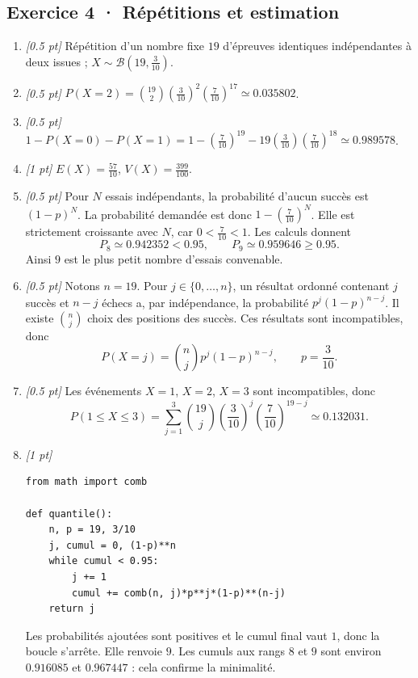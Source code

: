\subsection*{Exercice 4 · Répétitions et estimation}\begin{enumerate}

\item \textit{[\num{0,5} pt]} Répétition d'un nombre fixe $19$ d'épreuves identiques indépendantes à deux issues ; $X\sim\mathcal B(19,\frac{3}{10})$.

\item \textit{[\num{0,5} pt]} $P(X=2)=\binom{19}2(\frac{3}{10})^2(\frac{7}{10})^{17}\simeq\num{0,035802}$.

\item \textit{[\num{0,5} pt]} $1-P(X=0)-P(X=1)=1-(\frac{7}{10})^{19}-19(\frac{3}{10})(\frac{7}{10})^{18}\simeq\num{0,989578}$.

\item \textit{[1 pt]} $E(X)=\frac{57}{10}$, $V(X)=\frac{399}{100}$.

\item \textit{[\num{0,5} pt]} Pour $N$ essais indépendants, la probabilité d'aucun succès est $(1-p)^N$. La probabilité demandée est donc $1-(\frac{7}{10})^N$. Elle est strictement croissante avec $N$, car $0<\frac{7}{10}<1$. Les calculs donnent
\[P_{8}\simeq\num{0,942352}<\num{0,95},\qquad P_{9}\simeq\num{0,959646}\ge\num{0,95}.\]
Ainsi $9$ est le plus petit nombre d'essais convenable.

\item \textit{[\num{0,5} pt]} Notons $n=19$. Pour $j\in\{0,\ldots,n\}$, un résultat ordonné contenant $j$ succès et $n-j$ échecs a, par indépendance, la probabilité $p^j(1-p)^{n-j}$. Il existe $\binom nj$ choix des positions des succès. Ces résultats sont incompatibles, donc
\[P(X=j)=\binom nj p^j(1-p)^{n-j},\qquad p=\frac{3}{10}.\]

\item \textit{[\num{0,5} pt]} Les événements $X=1$, $X=2$, $X=3$ sont incompatibles, donc
\[P(1\le X\le3)=\sum_{j=1}^3\binom{19}j(\frac{3}{10})^j(\frac{7}{10})^{19-j}\simeq\num{0,132031}.\]


\item \textit{[1 pt]} 
\begin{lstlisting}
from math import comb

def quantile():
    n, p = 19, 3/10
    j, cumul = 0, (1-p)**n
    while cumul < 0.95:
        j += 1
        cumul += comb(n, j)*p**j*(1-p)**(n-j)
    return j
\end{lstlisting}
Les probabilités ajoutées sont positives et le cumul final vaut $1$, donc la boucle s'arrête. Elle renvoie $9$. Les cumuls aux rangs $8$ et $9$ sont environ $\num{0,916085}$ et $\num{0,967447}$ : cela confirme la minimalité.

\end{enumerate}

